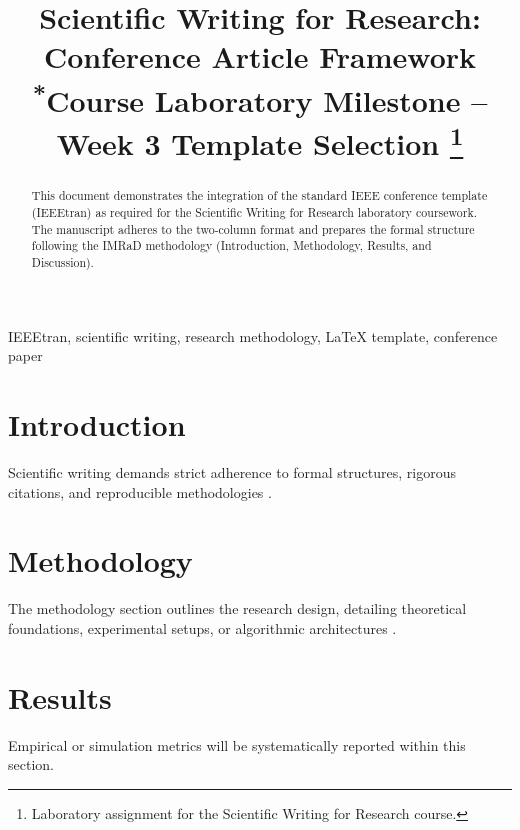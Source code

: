 \documentclass[conference]{IEEEtran}
\begin{document}
\title{Scientific Writing for Research: Conference Article Framework\\
{\footnotesize \textsuperscript{*}Course Laboratory Milestone -- Week 3 Template Selection}
\thanks{Laboratory assignment for the Scientific Writing for Research course.}
}

\author{
}

\maketitle

\begin{abstract}
This document demonstrates the integration of the standard IEEE conference template (IEEEtran) as required for the Scientific Writing for Research laboratory coursework. The manuscript adheres to the two-column format and prepares the formal structure following the IMRaD methodology (Introduction, Methodology, Results, and Discussion).
\end{abstract}

\begin{IEEEkeywords}
IEEEtran, scientific writing, research methodology, LaTeX template, conference paper
\end{IEEEkeywords}

\section{Introduction}
Scientific writing demands strict adherence to formal structures, rigorous citations, and reproducible methodologies \cite{ecarnot2015writing}.

\section{Methodology}
The methodology section outlines the research design, detailing theoretical foundations, experimental setups, or algorithmic architectures \cite{thuan2019construction}.

\section{Results}
Empirical or simulation metrics will be systematically reported within this section.
\end{document}
